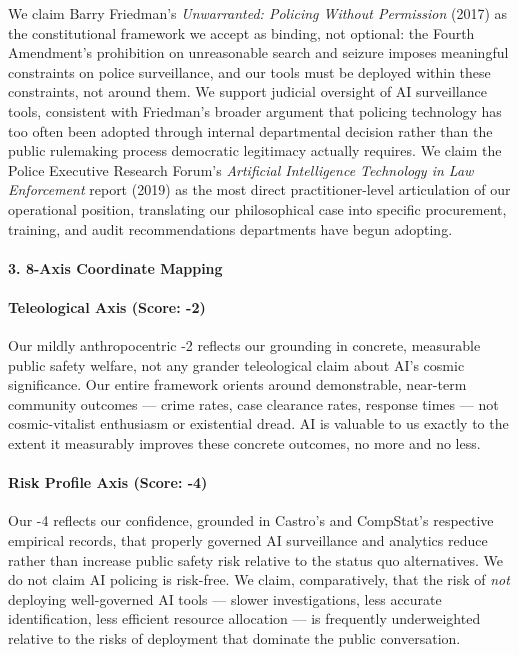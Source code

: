 We claim Barry Friedman's \emph{Unwarranted: Policing Without
Permission} (2017) as the constitutional framework we accept as binding,
not optional: the Fourth Amendment's prohibition on unreasonable search
and seizure imposes meaningful constraints on police surveillance, and
our tools must be deployed within these constraints, not around them. We
support judicial oversight of AI surveillance tools, consistent with
Friedman's broader argument that policing technology has too often been
adopted through internal departmental decision rather than the public
rulemaking process democratic legitimacy actually requires. We claim the
Police Executive Research Forum's \emph{Artificial Intelligence
Technology in Law Enforcement} report (2019) as the most direct
practitioner-level articulation of our operational position, translating
our philosophical case into specific procurement, training, and audit
recommendations departments have begun adopting.

\paragraph{3. 8-Axis Coordinate
Mapping}\label{axis-coordinate-mapping-26}

\paragraph{Teleological Axis (Score:
-2)}\label{teleological-axis-score--2-1}

Our mildly anthropocentric -2 reflects our grounding in concrete,
measurable public safety welfare, not any grander teleological claim
about AI's cosmic significance. Our entire framework orients around
demonstrable, near-term community outcomes --- crime rates, case
clearance rates, response times --- not cosmic-vitalist enthusiasm or
existential dread. AI is valuable to us exactly to the extent it
measurably improves these concrete outcomes, no more and no less.

\paragraph{Risk Profile Axis (Score:
-4)}\label{risk-profile-axis-score--4-3}

Our -4 reflects our confidence, grounded in Castro's and CompStat's
respective empirical records, that properly governed AI surveillance and
analytics reduce rather than increase public safety risk relative to the
status quo alternatives. We do not claim AI policing is risk-free. We
claim, comparatively, that the risk of \emph{not} deploying
well-governed AI tools --- slower investigations, less accurate
identification, less efficient resource allocation --- is frequently
underweighted relative to the risks of deployment that dominate the
public conversation.

